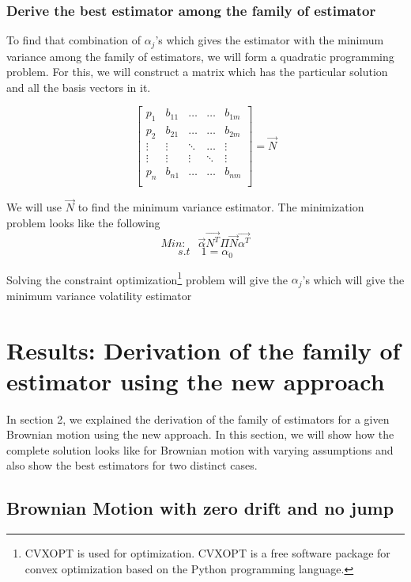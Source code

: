 \documentclass[12pt]{article}   	%
\begin{document}
\subsubsection{ Derive the best estimator among the family of estimator}
To find that combination of $\alpha_j$'s which gives the estimator with the minimum variance among the family of estimators, we will form 
a quadratic programming problem. For this, we will construct a matrix which has the particular solution and all the basis vectors in it.


\begin{equation}
 \begin{bmatrix}
	 p_{1}&b_{11}&\dots&\dots&b_{1m}\\
	p_{2}&b_{21}&\dots&\dots&b_{2m}\\
	\vdots&\vdots&\ddots&\dots&\vdots\\
	\vdots&\vdots&\vdots&\ddots&\vdots\\
	p_{n}&b_{n1}&\dots&\dots&b_{nm}\\
	\end{bmatrix}= \vec{N}
\end{equation}

We will use $\vec{N}$ to find the minimum variance estimator. The minimization problem looks like the following\\
$$
	Min: \quad  \vec{\alpha}\vec{N^T} \Pi \vec{N}  \vec{\alpha^T}    $$ 
	\begin{equation}
	s.t\quad  1= \alpha_0
\end{equation}


Solving the constraint optimization\footnote{CVXOPT is used for optimization. CVXOPT is a free software package for convex optimization based on the Python programming language.} problem will give the $\alpha_j$'s which will give the minimum variance volatility estimator

\section{Results: Derivation of the family of estimator using the new approach}
In section 2, we explained the derivation of the family of estimators for a given Brownian motion using the new approach. 
In this section, we will show how the complete solution looks like for Brownian motion with varying assumptions and also show the best estimators for two distinct cases. 
\subsection{Brownian Motion with zero drift and no jump}
\end{document}
